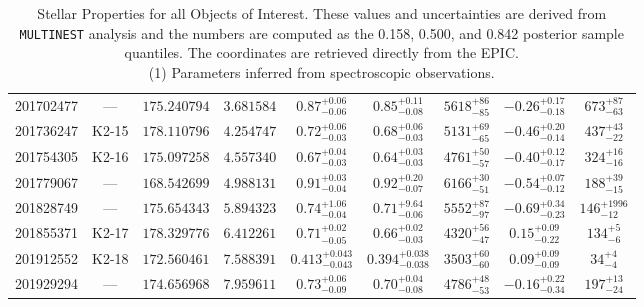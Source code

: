 \begin{landscape}
\begin{table}[hbt!]
\begin{center}
\begin{tabular}{lcccccccc}
 201702477 & ---       & $175.240794$ & $3.681584$ & $0.87^{+0.06}_{-0.06}$ & $0.85^{+0.11}_{-0.08}$ & $5618^{+  86}_{ -85}$ & $-0.26^{+0.17}_{-0.18}$ & $ 673^{+  87}_{ -63}$ \\ 
 201736247 & K2-15 & $178.110796$ & $4.254747$ & $0.72^{+0.06}_{-0.03}$ & $0.68^{+0.06}_{-0.03}$ & $5131^{+  69}_{ -65}$ & $-0.46^{+0.20}_{-0.14}$ & $ 437^{+  43}_{ -22}$ \\ 
 201754305 & K2-16 & $175.097258$ & $4.557340$ & $0.67^{+0.04}_{-0.03}$ & $0.64^{+0.03}_{-0.03}$ & $4761^{+  50}_{ -57}$ & $-0.40^{+0.12}_{-0.17}$ & $ 324^{+  16}_{ -16}$ \\ 
 201779067 & ---       & $168.542699$ & $4.988131$ & $0.91^{+0.03}_{-0.04}$ & $0.92^{+0.20}_{-0.07}$ & $6166^{+  30}_{ -51}$ & $-0.54^{+0.07}_{-0.12}$ & $ 188^{+  39}_{ -15}$ \\ 
 201828749 & ---       & $175.654343$ & $5.894323$ & $0.74^{+1.06}_{-0.04}$ & $0.71^{+9.64}_{-0.06}$ & $5552^{+  87}_{ -97}$ & $-0.69^{+0.34}_{-0.23}$ & $ 146^{+1996}_{ -12}$ \\ 
 201855371 & K2-17 & $178.329776$ & $6.412261$ & $0.71^{+0.02}_{-0.05}$ & $0.66^{+0.02}_{-0.03}$ & $4320^{+  56}_{ -47}$ & $0.15^{+0.09}_{-0.22}$ & $ 134^{+   5}_{  -6}$ \\ 
 201912552\tablenotemark{1} & K2-18 & $172.560461$ & $7.588391$ & $0.413^{+0.043}_{-0.043}$ & $0.394^{+0.038}_{-0.038}$ & $3503^{+  60}_{ -60}$ & $0.09^{+0.09}_{-0.09}$ & $  34^{+   4}_{  -4}$ \\ 
 201929294 & ---       & $174.656968$ & $7.959611$ & $0.73^{+0.06}_{-0.09}$ & $0.70^{+0.04}_{-0.08}$ & $4786^{+  48}_{ -53}$ & $-0.16^{+0.22}_{-0.34}$ & $ 197^{+  13}_{ -24}$ \\ 
\hline
\end{tabular}
\caption[Stellar Properties for all Objects of Interest]{Stellar Properties for all Objects of Interest. 
These values and uncertainties are derived from \texttt{MULTINEST} analysis and the
numbers are computed as the 0.158, 0.500, and 0.842 posterior sample quantiles. 
The coordinates are retrieved directly from the EPIC. \\
(1) Parameters inferred from spectroscopic observations.}
\end{center}
\label{Tab:Stars}
\end{table}
\end{landscape}
\clearpage